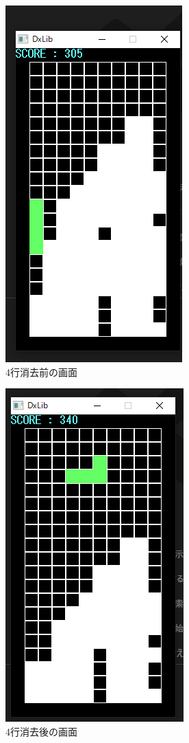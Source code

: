 \begin{figure}[htb]
  \begin{center}
    \includegraphics[scale=0.5]{./soft_img/tetorisbefore.png}
    \caption{4行消去前の画面}
    \label{tetoris}
  \end{center}
\end{figure}
\begin{figure}[htb]
  \begin{center}
    \includegraphics[scale=0.5]{./soft_img/tetorisafter.png}
    \caption{4行消去後の画面}
    \label{tetoris2}
  \end{center}
\end{figure}
